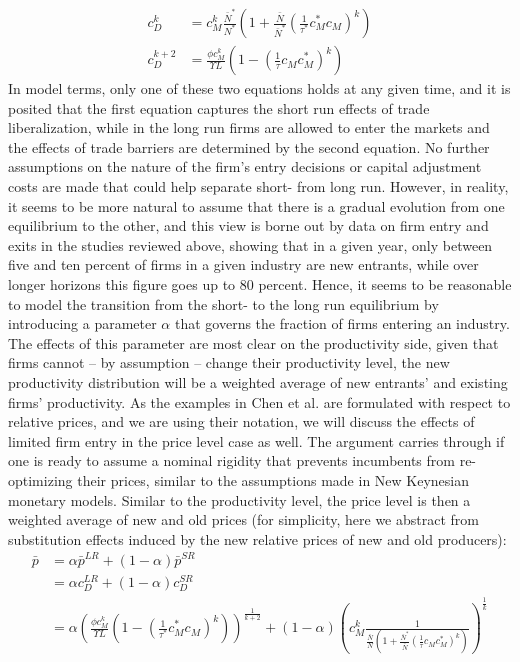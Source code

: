 \begin{align*}
c_D^k &= c_M^k \frac{\bar{N}^*}{N^*} \left( 1+ \frac{\bar{N}}{\bar{N}^*} \left(\frac{1}{\tau^*}{c_M^*}{c_M}\right)^k \right) \\
c_D^{k+2} &= \frac{\phi c_M^k}{\Upsilon L} \left(1- \left(\frac{1}{\tau}{c_M}{c_M^*}\right)^k \right)
\end{align*}
In model terms, only one of these two equations holds at any given time, and it is posited that the first equation captures the short run effects of trade liberalization, while in the long run firms are allowed to enter the markets and the effects of trade barriers are determined by the second equation. No further assumptions on the nature of the firm's entry decisions or capital adjustment costs are made that could help separate short- from long run. However, in reality, it seems to be more natural to assume that there is a gradual evolution from one equilibrium to the other, and this view is borne out by data on firm entry and exits in the studies reviewed above, showing that in a given year, only between five and ten percent of firms in a given industry are new entrants, while over longer horizons this figure goes up to 80 percent. Hence, it seems to be reasonable to model the transition from the short- to the long run equilibrium by introducing a parameter $\alpha$ that governs the fraction of firms entering an industry. The effects of this parameter are most clear on the productivity side, given that firms cannot -- by assumption -- change their productivity level, the new productivity distribution will be a weighted average of new entrants' and existing firms' productivity. As the examples in Chen et al. are formulated with respect to relative prices, and we are using their notation, we will discuss the effects of limited firm entry in the price level case as well. The argument carries through if one is ready to assume a nominal rigidity that prevents incumbents from re-optimizing their prices, similar to the assumptions made in New Keynesian monetary models. Similar to the productivity level, the price level is then a weighted average of new and old prices (for simplicity, here we abstract from substitution effects induced by the new relative prices of new and old producers):
\begin{align*}
\bar{p} &=\alpha \bar{p}^{LR} + (1-\alpha) \bar{p}^{SR} \\
				&=\alpha c_D^{LR} + (1-\alpha) c_D^{SR} \\
        &=\alpha \left( \frac{\phi c_M^k}{\Upsilon L} \left(1- \left(\frac{1}{\tau^*}{c_M^*}{c_M}\right)^k  \right) \right)^{\frac{1}{k+2}} + (1-\alpha) \left(c_M^k \frac{1}{ \frac{\bar{N}}{N}\left( 1+ \frac{\bar{N}^*}{\bar{N}} \left(\frac{1}{\tau}{c_M}{c_M^*}\right)^k \right) } \right)^{\frac{1}{k}}							
\end{align*}
